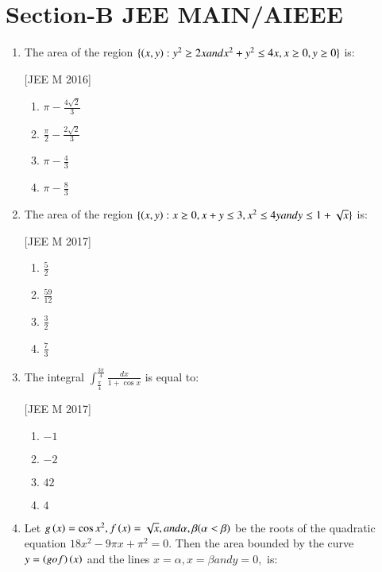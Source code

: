 \documentclass[journal,12pt,onecolumn]{IEEEtran}
\theoremstyle{remark}
\begin{document}
\section*{\textbf{Section-B} JEE MAIN/AIEEE }
\begin{enumerate}
	\item The area  of the region $\{\left(x,y\right):y^{2}\geq 2x and x^{2}+y^{2}\leq 4x, x\geq0, y\geq0\}$ is:

		\hfill{[JEE M 2016]}
		\begin{enumerate}
			\item $\pi - \frac{4\sqrt{2}}{3}$

			\item $\frac{\pi}{2}-\frac{2\sqrt{2}}{3}$

			\item $\pi - \frac{4}{3}$

			\item $\pi - \frac{8}{3}$
		\end{enumerate}
	\item The area  of the region $\{\left(x,y\right): x\geq0, x+y\leq3, x^{2}\leq4y and y\leq1+\sqrt{x}\}$ is:

		\hfill{[JEE M 2017]}
		\begin{enumerate}
			\item $\frac{5}{2}$

			\item $\frac{59}{12}$

			\item $\frac{3}{2}$

			\item $\frac{7}{3}$
		\end{enumerate}
	\item The integral $\int_{\frac{\pi}{4}}^{\frac{3\pi}{4}}\frac{dx}{1+\cos x}$ is equal to:

		\hfill{[JEE M 2017]}
		\begin{enumerate}
			\item $-1$
			\item $-2$
			\item $42$
			\item $4$
		\end{enumerate}
	\item Let $g\left(x\right)=\cos x^{2}, f\left(x\right)=\sqrt{x}, and \alpha, \beta (\alpha<\beta)$ be the roots of the quadratic equation $18x^{2}-9\pi x+\pi^{2}=0.$ Then the area  bounded by the curve $y=\left(gof\right)\left(x\right)$ and the lines $x=\alpha, x=\beta and y=0,$ is:


\end{enumerate}
\end{document}
